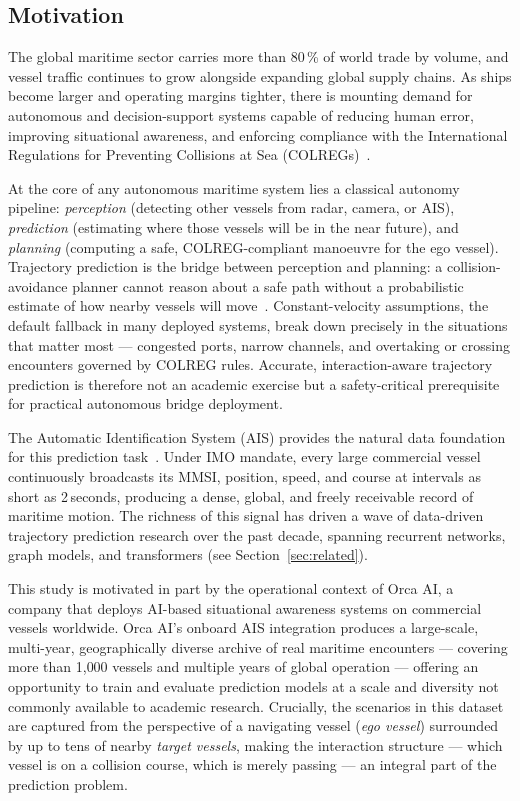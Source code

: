 \documentclass[12pt, a4paper]{article}
\begin{document}
  \subsection{Motivation}

  The global maritime sector carries more than 80\,\% of world trade by volume, and vessel
  traffic continues to grow alongside expanding global supply chains.  As ships become larger
  and operating margins tighter, there is mounting demand for autonomous and decision-support
  systems capable of reducing human error, improving situational awareness, and enforcing
  compliance with the International Regulations for Preventing Collisions at Sea
  (COLREGs)~\citep{colregs1972}.

  At the core of any autonomous maritime system lies a classical autonomy pipeline:
  \textit{perception} (detecting other vessels from radar, camera, or AIS),
  \textit{prediction} (estimating where those vessels will be in the near future), and
  \textit{planning} (computing a safe, COLREG-compliant manoeuvre for the ego vessel).
  Trajectory prediction is the bridge between perception and planning: a collision-avoidance
  planner cannot reason about a safe path without a probabilistic estimate of how nearby
  vessels will move~\citep{kuwata2014safe, vagale2021path, mahipala2025colreg}.
  Constant-velocity assumptions, the default fallback in many deployed systems, break down
  precisely in the situations that matter most — congested ports, narrow channels, and
  overtaking or crossing encounters governed by COLREG rules.  Accurate, interaction-aware
  trajectory prediction is therefore not an academic exercise but a safety-critical
  prerequisite for practical autonomous bridge deployment.

  The Automatic Identification System (AIS) provides the natural data foundation for
  this prediction task~\citep{itu2014ais}.  Under IMO mandate, every large commercial
  vessel continuously broadcasts its MMSI, position, speed, and course at intervals as
  short as 2\,seconds, producing a dense, global, and freely receivable record of maritime
  motion.  The richness of this signal has driven a wave of data-driven trajectory
  prediction research over the past decade, spanning recurrent networks, graph models,
  and transformers (see Section~\ref{sec:related}).

  This study is motivated in part by the operational context of Orca AI, a company that
  deploys AI-based situational awareness systems on commercial vessels worldwide.
  Orca AI's onboard AIS integration produces a large-scale, multi-year, geographically
  diverse archive of real maritime encounters — covering more than 1{,}000 vessels and
  multiple years of global operation — offering an opportunity to train and evaluate
  prediction models at a scale and diversity not commonly available to academic research.
  Crucially, the scenarios in this dataset are captured from the perspective of a navigating
  vessel (\textit{ego vessel}) surrounded by up to tens of nearby \textit{target vessels},
  making the interaction structure — which vessel is on a collision course, which is merely
  passing — an integral part of the prediction problem.
\end{document}
